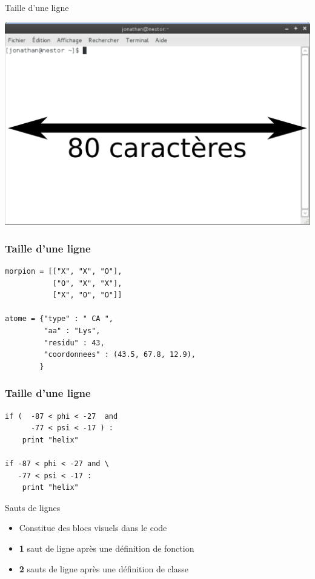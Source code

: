 \documentclass[xcolor=pdftex,dvipsnames,table,handout]{beamer}
\begin{document}
\begin{frame}{Taille d'une ligne}
\begin{center}
\includegraphics[width=0.7\linewidth]{img/Capture-Terminal.pdf}
\end{center}
\end{frame}

\begin{frame}[fragile]
\frametitle{Taille d'une ligne}
\begin{lstlisting}
morpion = [["X", "X", "O"],
           ["O", "X", "X"],
           ["X", "O", "O"]]

atome = {"type" : " CA ",
         "aa" : "Lys",
         "residu" : 43,
         "coordonnees" : (43.5, 67.8, 12.9),
        }
\end{lstlisting}
\end{frame}


\begin{frame}[fragile]
\frametitle{Taille d'une ligne}
\begin{lstlisting}
if (  -87 < phi < -27  and 
      -77 < psi < -17 ) :
    print "helix"

if -87 < phi < -27 and \
   -77 < psi < -17 :
    print "helix"
\end{lstlisting}
\end{frame}

\begin{frame}{Sauts de lignes}
\begin{itemize}
    \item Constitue des blocs visuels dans le code
    \item \textbf{1} saut de ligne après une définition de fonction
    \item \textbf{2} sauts de ligne après une définition de classe
\end{itemize}
\end{frame}
\end{document}
